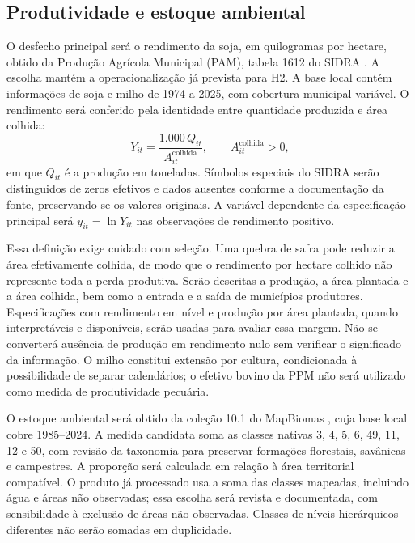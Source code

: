 \subsection{Produtividade e estoque ambiental}

O desfecho principal será o rendimento da soja, em quilogramas por hectare, obtido da Produção Agrícola Municipal (PAM), tabela 1612 do SIDRA \cite{IBGEPAM2026}. A escolha mantém a operacionalização já prevista para H2. A base local contém informações de soja e milho de 1974 a 2025, com cobertura municipal variável. O rendimento será conferido pela identidade entre quantidade produzida e área colhida:
\begin{equation}
Y_{it}=\frac{1.000\,Q_{it}}{A^{\mathrm{colhida}}_{it}},
\qquad A^{\mathrm{colhida}}_{it}>0,
\label{eq:rendimento}
\end{equation}
em que $Q_{it}$ é a produção em toneladas. Símbolos especiais do SIDRA serão distinguidos de zeros efetivos e dados ausentes conforme a documentação da fonte, preservando-se os valores originais. A variável dependente da especificação principal será $y_{it}=\ln Y_{it}$ nas observações de rendimento positivo.

Essa definição exige cuidado com seleção. Uma quebra de safra pode reduzir a área efetivamente colhida, de modo que o rendimento por hectare colhido não represente toda a perda produtiva. Serão descritas a produção, a área plantada e a área colhida, bem como a entrada e a saída de municípios produtores. Especificações com rendimento em nível e produção por área plantada, quando interpretáveis e disponíveis, serão usadas para avaliar essa margem. Não se converterá ausência de produção em rendimento nulo sem verificar o significado da informação. O milho constitui extensão por cultura, condicionada à possibilidade de separar calendários; o efetivo bovino da PPM não será utilizado como medida de produtividade pecuária.

O estoque ambiental será obtido da coleção 10.1 do MapBiomas \cite{MapBiomas2026}, cuja base local cobre 1985--2024. A medida candidata soma as classes nativas 3, 4, 5, 6, 49, 11, 12 e 50, com revisão da taxonomia para preservar formações florestais, savânicas e campestres. A proporção será calculada em relação à área territorial compatível. O produto já processado usa a soma das classes mapeadas, incluindo água e áreas não observadas; essa escolha será revista e documentada, com sensibilidade à exclusão de áreas não observadas. Classes de níveis hierárquicos diferentes não serão somadas em duplicidade.

